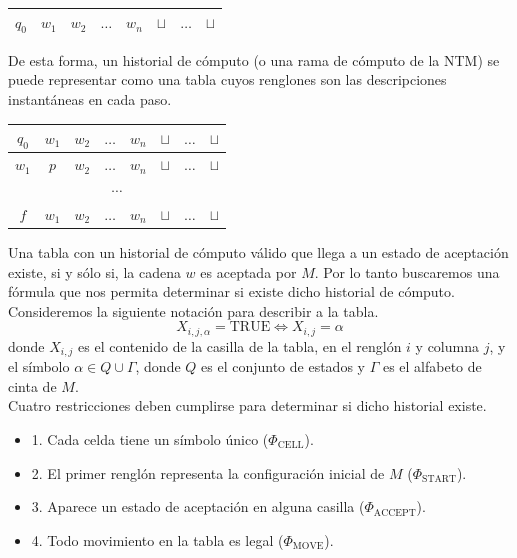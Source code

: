 \documentclass[a4paper]{article}
\begin{document}
\begin{table}
  \begin{center}
    \begin{tabular}{| c | c | c | C{2cm} | c | c | C{4cm} | c |}
      \hline
      $q_0$ & $w_1$ & $w_2$ & $\dots$ & $w_n$ & $\sqcup$ & $\dots$ & $\sqcup$\\
      \hline
    \end{tabular}
  \end{center}
\end{table}

De esta forma, un historial de cómputo (o una rama de cómputo de la NTM) se puede representar como una tabla cuyos renglones son las descripciones instantáneas en cada paso.\\
\begin{table}[h]
  \begin{center}
    \begin{tabular}{| c | c | c | C{2cm} | c | c | C{4cm} | c |}
      \hline
      $q_0$ & $w_1$ & $w_2$ & $\dots$ & $w_n$ & $\sqcup$ & $\dots$ & $\sqcup$\\
      \hline
      $w_1$ & $p$ & $w_2$ & $\dots$ & $w_n$ & $\sqcup$ & $\dots$ & $\sqcup$\\
      \hline
      \\
      \hline
      $f$ & $w_1$ & $w_2$ & $\dots$ & $w_n$ & $\sqcup$ & $\dots$ & $\sqcup$\\
      \hline
    \end{tabular}
  \end{center}
\end{table}

Una tabla con un historial de cómputo válido que llega a un estado de aceptación existe, si y sólo si, la cadena $w$ es aceptada por $M$. Por lo tanto buscaremos una fórmula que nos permita determinar si existe dicho historial de cómputo.\\
Consideremos la siguiente notación para describir a la tabla.
$$X_{i,j,\alpha} = \text{TRUE} \iff X_{i,j} = \alpha$$
donde $X_{i,j}$ es el contenido de la casilla de la tabla, en el renglón $i$ y columna $j$, y el símbolo $\alpha \in Q\cup\Gamma$, donde $Q$ es el conjunto de estados y $\Gamma$ es el alfabeto de cinta de $M$.\\

Cuatro restricciones deben cumplirse para determinar si dicho historial existe.

\begin{itemize}
  \item 1. Cada celda tiene un símbolo único ($\Phi_{\text{CELL}}$).
  \item 2. El primer renglón representa la configuración inicial de $M$ ($\Phi_{\text{START}}$).
  \item 3. Aparece un estado de aceptación en alguna casilla ($\Phi_{\text{ACCEPT}}$).
  \item 4. Todo movimiento en la tabla es legal ($\Phi_{\text{MOVE}}$).
\end{itemize}
\end{document}
